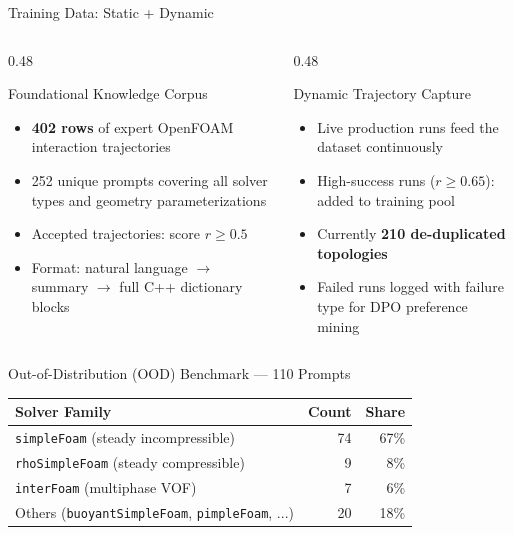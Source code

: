 \documentclass[aspectratio=169,10pt]{beamer}
\begin{document}
\begin{frame}{Training Data: Static + Dynamic}
  \begin{columns}
    \begin{column}{0.48\textwidth}
      \begin{block}{Foundational Knowledge Corpus}
        \begin{itemize}
          \item \textbf{402 rows} of expert OpenFOAM interaction trajectories
          \item 252 unique prompts covering all solver types and geometry parameterizations
          \item Accepted trajectories: score $r \geq 0.5$
          \item Format: natural language $\to$ summary $\to$ full C++ dictionary blocks
        \end{itemize}
      \end{block}
    \end{column}
    \begin{column}{0.48\textwidth}
      \begin{block}{Dynamic Trajectory Capture}
        \begin{itemize}
          \item Live production runs feed the dataset continuously
          \item High-success runs ($r \geq 0.65$): added to training pool
          \item Currently \textbf{210 de-duplicated topologies}
          \item Failed runs logged with failure type for DPO preference mining
        \end{itemize}
      \end{block}
    \end{column}
  \end{columns}
  \vspace{8pt}
  \begin{exampleblock}{Out-of-Distribution (OOD) Benchmark — 110 Prompts}
    \centering\small
    \begin{tabular}{lrr}
      \toprule
      \textbf{Solver Family} & \textbf{Count} & \textbf{Share} \\
      \midrule
      \texttt{simpleFoam} (steady incompressible) & 74 & 67\% \\
      \texttt{rhoSimpleFoam} (steady compressible) & 9 & 8\% \\
      \texttt{interFoam} (multiphase VOF) & 7 & 6\% \\
      Others (\texttt{buoyantSimpleFoam}, \texttt{pimpleFoam}, ...) & 20 & 18\% \\
      \bottomrule
    \end{tabular}
  \end{exampleblock}
\end{frame}
\end{document}
